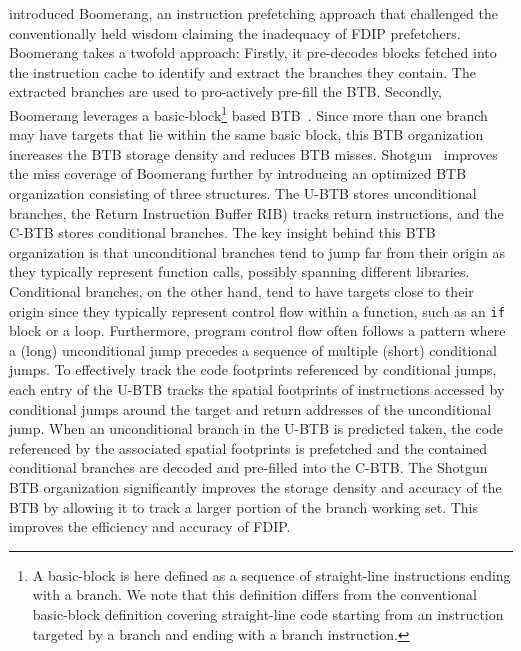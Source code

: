 \documentclass[../main.tex]{subfiles}
\begin{document}
\begin{refsection}
\textcite{kumar17_boomer} introduced Boomerang, an instruction
prefetching approach that challenged the conventionally held wisdom
claiming the inadequacy of FDIP prefetchers. Boome\-rang takes a twofold
approach: Firstly, it pre-decodes blocks fetched into the instruction
cache to identify and extract the branches they contain. The extracted
branches are used to pro-actively pre-fill the BTB. Secondly,
Boomerang leverages a basic-block\footnote{A basic-block is here defined as
  a sequence of straight-line instructions ending with a branch. We note that this definition differs from the conventional basic-block definition covering straight-line code starting from an instruction targeted by a branch and ending with a branch instruction.} based
BTB~\cite{yeh92_compr_instr_fetch_mechan_for}. Since more than one
branch may have targets that lie within the same basic block, this BTB
organization increases the BTB storage density and reduces BTB
misses. Shotgun~\cite{kumar18_blast_throug_front_end_bottl_with_shotg,kumar20_shoot_down_server_front_end_bottl}
improves the miss coverage of Boomerang further by introducing an
optimized BTB organization consisting of three structures. The U-BTB stores unconditional branches, the Return Instruction Buffer RIB) tracks return instructions, and the C-BTB stores conditional branches. The key insight
behind this BTB organization is that unconditional branches tend to
jump far from their origin as they typically represent function calls,
possibly spanning different libraries. Conditional branches, on the
other hand, tend to have targets close to their origin since they
typically represent control flow within a function, such as an
\texttt{if} block or a loop. Furthermore, program control flow often follows a pattern where a (long) unconditional jump precedes a sequence of multiple (short) conditional jumps. To effectively track the code footprints referenced by conditional jumps, each entry of the U-BTB
tracks the spatial footprints of instructions accessed by conditional
jumps around the target and return addresses of the unconditional
jump. When an unconditional branch in the U-BTB is predicted taken,
the code referenced by the associated spatial footprints is prefetched
and the contained conditional branches are decoded and pre-filled into
the C-BTB. The Shotgun BTB organization significantly improves the
storage density and accuracy of the BTB by allowing it to track a
larger portion of the branch working set. This improves the efficiency
and accuracy of FDIP.


\end{refsection}
\end{document}
